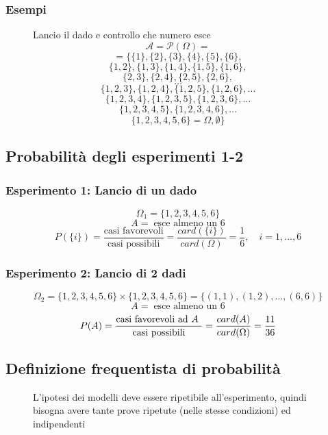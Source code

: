 \documentclass[a4paper]{article}
\theoremstyle{break}
\theoremstyle{break}
\theoremstyle{break}
\theoremstyle{break}
\begin{document}
\subsubsection{Esempi}
\begin{figure}[H]
	\begin{example}
		Lancio il dado e controllo che numero esce
		\[
			\mathcal{A} = \mathcal{P}(\Omega) =
		\]
		\[
			= \Big\{ \{1\} ,\{2\} ,\{3\}, \{4\}, \{5\}, \{6\},
		\]
		\[
			\{1,2\}, \{1,3\}, \{1,4\}, \{1,5\}, \{1,6\},
		\]
		\[
			\{2,3\}, \{2,4\}, \{2,5\}, \{2,6\},
		\]
		\[
			\ldots
		\]
		\[
			\{1,2,3\}, \{1,2,4\}, \{1,2,5\}, \{1,2,6\},\ldots
		\]
		\[
			\{1,2,3,4\}, \{1,2,3,5\}, \{1,2,3,6\},\ldots
		\]
		\[
			\{1,2,3,4,5\}, \{1,2,3,4,6\},\ldots
		\]
		\[
			\{1,2,3,4,5,6\} = \Omega, \emptyset \Big\}
		\]
	\end{example}
\end{figure}

\subsection{Probabilità degli esperimenti 1-2}
\subsubsection{Esperimento 1: Lancio di un dado}
\[
	\Omega_1 = \{1, 2, 3, 4, 5, 6\}
\]
\[
	A = \; \text{esce almeno un 6}
\]
\[
	P(\{i\} ) = \frac{\text{casi favorevoli}}{\text{casi possibili}} = \frac{card(\{i\} )}
	{card(\Omega)} = \frac{1}{6}, \quad i = 1, \ldots, 6
\]

\subsubsection{Esperimento 2: Lancio di 2 dadi}
\[
	\Omega_2 = \{1, 2, 3, 4, 5, 6\} \times \{1, 2, 3, 4, 5, 6\} = \{(1,1), (1,2), \ldots, (6,6)\}
\]
\[
	A = \; \text{esce almeno un 6}
\]
\[
	P(A) = \frac{\text{casi favorevoli ad \( A \) }}{\text{casi possibili}} = \frac{card(A)}{card(\Omega)}
	= \frac{11}{36}
\]
\subsection{Definizione frequentista di probabilità}
\begin{figure}[H]
	\begin{define}
		L'ipotesi dei modelli deve essere ripetibile all'esperimento, quindi bisogna avere
		tante prove ripetute (nelle stesse condizioni) ed indipendenti
	\end{define}
\end{figure}
\end{document}
